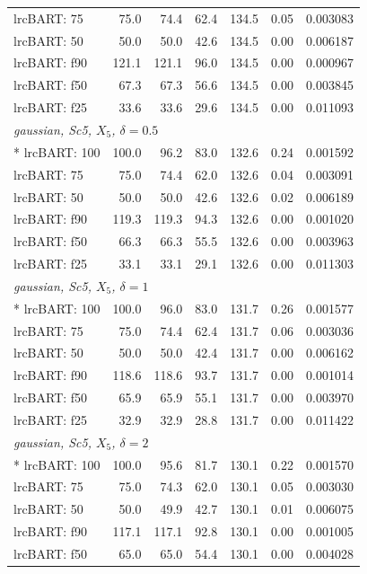 \begin{longtable}{lrrrrrr}
lrcBART: 75 & 75.0 & 74.4 & 62.4 & 134.5 & 0.05 & 0.003083 \\
lrcBART: 50 & 50.0 & 50.0 & 42.6 & 134.5 & 0.00 & 0.006187 \\
lrcBART: f90 & 121.1 & 121.1 & 96.0 & 134.5 & 0.00 & 0.000967 \\
lrcBART: f50 & 67.3 & 67.3 & 56.6 & 134.5 & 0.00 & 0.003845 \\
lrcBART: f25 & 33.6 & 33.6 & 29.6 & 134.5 & 0.00 & 0.011093 \\
\multicolumn{7}{l}{\strut\textit{gaussian, Sc5, $X_5$, $\delta=0.5$}}\\*
lrcBART: 100 & 100.0 & 96.2 & 83.0 & 132.6 & 0.24 & 0.001592 \\
lrcBART: 75 & 75.0 & 74.4 & 62.0 & 132.6 & 0.04 & 0.003091 \\
lrcBART: 50 & 50.0 & 50.0 & 42.6 & 132.6 & 0.02 & 0.006189 \\
lrcBART: f90 & 119.3 & 119.3 & 94.3 & 132.6 & 0.00 & 0.001020 \\
lrcBART: f50 & 66.3 & 66.3 & 55.5 & 132.6 & 0.00 & 0.003963 \\
lrcBART: f25 & 33.1 & 33.1 & 29.1 & 132.6 & 0.00 & 0.011303 \\
\multicolumn{7}{l}{\strut\textit{gaussian, Sc5, $X_5$, $\delta=1$}}\\*
lrcBART: 100 & 100.0 & 96.0 & 83.0 & 131.7 & 0.26 & 0.001577 \\
lrcBART: 75 & 75.0 & 74.4 & 62.4 & 131.7 & 0.06 & 0.003036 \\
lrcBART: 50 & 50.0 & 50.0 & 42.4 & 131.7 & 0.00 & 0.006162 \\
lrcBART: f90 & 118.6 & 118.6 & 93.7 & 131.7 & 0.00 & 0.001014 \\
lrcBART: f50 & 65.9 & 65.9 & 55.1 & 131.7 & 0.00 & 0.003970 \\
lrcBART: f25 & 32.9 & 32.9 & 28.8 & 131.7 & 0.00 & 0.011422 \\
\multicolumn{7}{l}{\strut\textit{gaussian, Sc5, $X_5$, $\delta=2$}}\\*
lrcBART: 100 & 100.0 & 95.6 & 81.7 & 130.1 & 0.22 & 0.001570 \\
lrcBART: 75 & 75.0 & 74.3 & 62.0 & 130.1 & 0.05 & 0.003030 \\
lrcBART: 50 & 50.0 & 49.9 & 42.7 & 130.1 & 0.01 & 0.006075 \\
lrcBART: f90 & 117.1 & 117.1 & 92.8 & 130.1 & 0.00 & 0.001005 \\
lrcBART: f50 & 65.0 & 65.0 & 54.4 & 130.1 & 0.00 & 0.004028 \\

\end{longtable}
